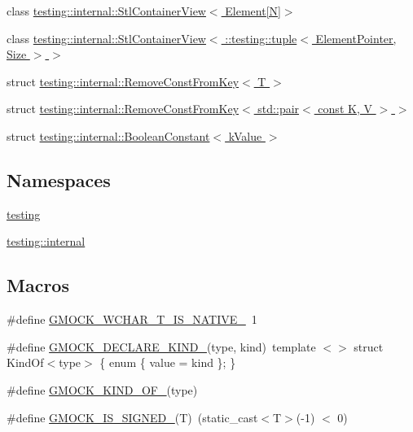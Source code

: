 \begin{DoxyCompactItemize}
\item 
class \hyperlink{classtesting_1_1internal_1_1_stl_container_view_3_01_element[_n]_4}{testing\+::internal\+::\+Stl\+Container\+View$<$ Element\mbox{[}\+N\mbox{]}$>$}
\item 
class \hyperlink{classtesting_1_1internal_1_1_stl_container_view_3_01_1_1testing_1_1tuple_3_01_element_pointer_00_01_size_01_4_01_4}{testing\+::internal\+::\+Stl\+Container\+View$<$ \+::testing\+::tuple$<$ Element\+Pointer, Size $>$ $>$}
\item 
struct \hyperlink{structtesting_1_1internal_1_1_remove_const_from_key}{testing\+::internal\+::\+Remove\+Const\+From\+Key$<$ T $>$}
\item 
struct \hyperlink{structtesting_1_1internal_1_1_remove_const_from_key_3_01std_1_1pair_3_01const_01_k_00_01_v_01_4_01_4}{testing\+::internal\+::\+Remove\+Const\+From\+Key$<$ std\+::pair$<$ const K, V $>$ $>$}
\item 
struct \hyperlink{structtesting_1_1internal_1_1_boolean_constant}{testing\+::internal\+::\+Boolean\+Constant$<$ k\+Value $>$}
\end{DoxyCompactItemize}
\subsection*{Namespaces}
\begin{DoxyCompactItemize}
\item 
 \hyperlink{namespacetesting}{testing}
\item 
 \hyperlink{namespacetesting_1_1internal}{testing\+::internal}
\end{DoxyCompactItemize}
\subsection*{Macros}
\begin{DoxyCompactItemize}
\item 
\#define \hyperlink{gmock-internal-utils_8h_a0725bd2b3326d282677e5197e53cc5e9}{G\+M\+O\+C\+K\+\_\+\+W\+C\+H\+A\+R\+\_\+\+T\+\_\+\+I\+S\+\_\+\+N\+A\+T\+I\+V\+E\+\_\+}~1
\item 
\#define \hyperlink{gmock-internal-utils_8h_a7d8a1871d7a30543a4e1882a8b2bbcd8}{G\+M\+O\+C\+K\+\_\+\+D\+E\+C\+L\+A\+R\+E\+\_\+\+K\+I\+N\+D\+\_\+}(type,  kind)~template $<$$>$ struct Kind\+Of$<$type$>$ \{ enum \{ value = kind \}; \}
\item 
\#define \hyperlink{gmock-internal-utils_8h_a72b01bdd08b78e927270885ca880ead4}{G\+M\+O\+C\+K\+\_\+\+K\+I\+N\+D\+\_\+\+O\+F\+\_\+}(type)
\item 
\#define \hyperlink{gmock-internal-utils_8h_a8ee49a1af821b48fd83849c050d0d5a2}{G\+M\+O\+C\+K\+\_\+\+I\+S\+\_\+\+S\+I\+G\+N\+E\+D\+\_\+}(T)~(static\+\_\+cast$<$T$>$(-\/1) $<$ 0)
\end{DoxyCompactItemize}
